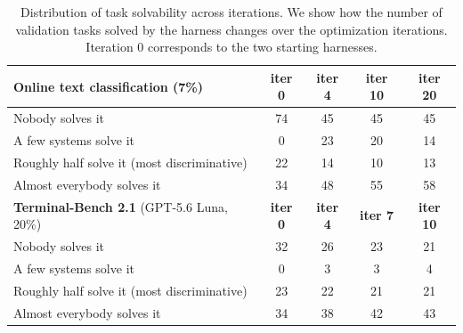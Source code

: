 \begin{table}[t]
\centering
\caption{Distribution of task solvability across iterations. We show how the number of validation tasks solved by the harness changes over the optimization iterations. Iteration 0 corresponds to the two starting harnesses.}
\label{table:difficulty}
\small
\setlength{\tabcolsep}{6pt}
\begin{tabular}{lcccc}
\toprule
\textbf{Online text classification} (7\%) & \textbf{iter 0} & \textbf{iter 4} & \textbf{iter 10} & \textbf{iter 20} \\
\midrule
Nobody solves it & 74 & 45 & 45 & 45 \\
A few systems solve it & 0 & 23 & 20 & 14 \\
Roughly half solve it (most discriminative) & 22 & 14 & 10 & 13 \\
Almost everybody solves it & 34 & 48 & 55 & 58 \\
\midrule[\heavyrulewidth]
\textbf{Terminal-Bench 2.1} (GPT-5.6 Luna, 20\%) & \textbf{iter 0} & \textbf{iter 4} & \textbf{iter 7} & \textbf{iter 10} \\
\midrule
Nobody solves it & 32 & 26 & 23 & 21 \\
A few systems solve it & 0 & 3 & 3 & 4 \\
Roughly half solve it (most discriminative) & 23 & 22 & 21 & 21 \\
Almost everybody solves it & 34 & 38 & 42 & 43 \\
\bottomrule
\end{tabular}
\end{table}